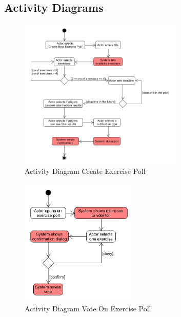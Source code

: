 \patchcmd{\appendices}{\quad}{: }{}{}
\begin{appendices}
\section{Activity Diagrams}
\label{appendix:activity_diagrams}

\begin{figure}[H]
    \centering
    \includegraphics[width=0.7\textwidth,keepaspectratio]{content/pictures/activity_diagrams/ActivityDiagram_CreateExercisePoll.png}
    \caption{Activity Diagram Create Exercise Poll}
	\label{fig:activity_diagram_create_exercise_poll}
\end{figure}

\begin{figure}[H]
    \centering
    \includegraphics[width=0.5\textwidth,keepaspectratio]{content/pictures/activity_diagrams/ActivityDiagram_VoteOnExercisePoll.png}
    \caption{Activity Diagram Vote On Exercise Poll}
	\label{fig:activity_diagram_vote_on_exercise_poll}
\end{figure}


\end{appendices}
